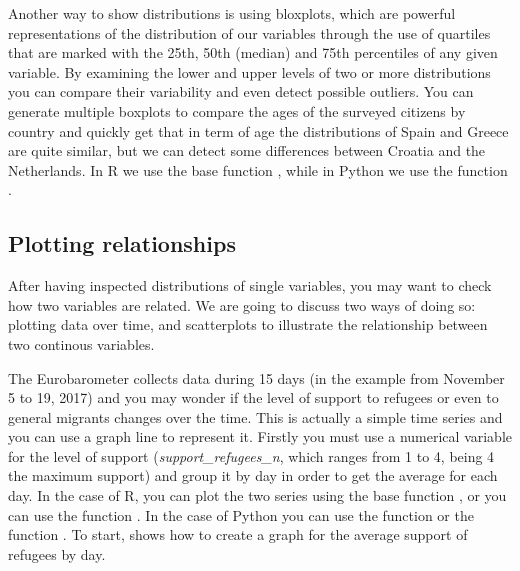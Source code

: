 Another way to show distributions is using bloxplots, which are powerful representations of the distribution of our variables through the use of quartiles that are marked with the 25th, 50th (median) and 75th percentiles of any given variable. By examining the lower and upper levels of two or more distributions you can compare their variability and even detect possible outliers. You can generate multiple boxplots to compare the ages of the surveyed citizens by country and quickly get that in term of age the distributions of Spain and Greece are quite similar, but we can detect some differences between Croatia and the Netherlands. In R we use the base function , while in Python we use the  function .





\subsection{Plotting relationships}

After having inspected distributions of single variables, you may want to check how two variables are related. We are going to discuss two ways of doing so: plotting data over time, and scatterplots to illustrate the relationship between two continous variables.

The Eurobarometer collects data during 15 days (in the example from November 5 to 19, 2017) and you may wonder if the level of support to refugees or even to general migrants changes over the time. This is actually a simple time series and you can use a graph line to represent it. Firstly you must use a numerical variable for the level of support (\emph{support\_refugees\_n}, which ranges from 1 to 4, being 4 the maximum support) and group it by day in order to get the average for each day. In the case of R, you can plot the two series using the base function , or you can use the  function . In the case of Python you can use the  function  or the  function . To start,  shows how to create a graph for the average support of refugees by day.



